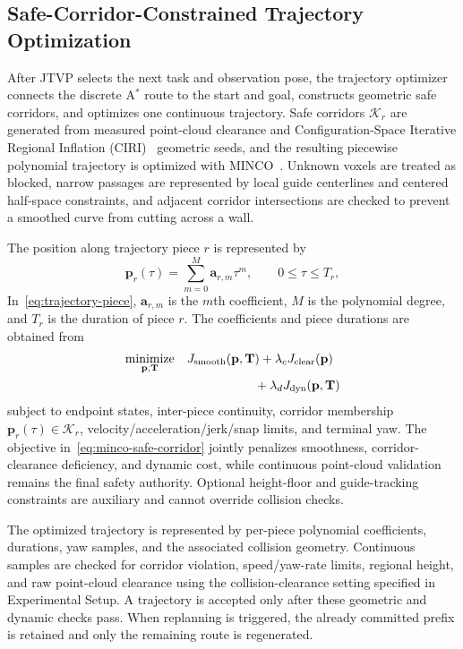 \documentclass[letterpaper,10pt,journal]{IEEEtran}
\begin{document}
\subsection{Safe-Corridor-Constrained Trajectory Optimization}

After JTVP selects the next task and observation pose, the trajectory optimizer connects the discrete A$^*$ route to the start and goal, constructs geometric safe corridors, and optimizes one continuous trajectory. Safe corridors $\mathcal K_r$ are generated from measured point-cloud clearance and Configuration-Space Iterative Regional Inflation (CIRI)~\cite{ren2025super} geometric seeds, and the resulting piecewise polynomial trajectory is optimized with MINCO~\cite{wang2022minco}. Unknown voxels are treated as blocked, narrow passages are represented by local guide centerlines and centered half-space constraints, and adjacent corridor intersections are checked to prevent a smoothed curve from cutting across a wall.

The position along trajectory piece $r$ is represented by
\begin{equation}
\mathbf{p}_r(\tau)=\sum_{m=0}^{M}\mathbf{a}_{r,m}\tau^m,
\qquad 0\leq\tau\leq T_r,
\label{eq:trajectory-piece}
\end{equation}
In~\eqref{eq:trajectory-piece}, $\mathbf{a}_{r,m}$ is the $m$th coefficient, $M$ is the polynomial degree, and $T_r$ is the duration of piece $r$. The coefficients and piece durations are obtained from
\begin{equation}
\begin{aligned}
\underset{\mathbf{p},\mathbf{T}}{\operatorname{minimize}}\quad
&J_{\mathrm{smooth}}(\mathbf{p},\mathbf{T})
+\lambda_cJ_{\mathrm{clear}}(\mathbf{p})\\
&\hspace{19mm}+\lambda_dJ_{\mathrm{dyn}}(\mathbf{p},\mathbf{T})
\end{aligned}
\label{eq:minco-safe-corridor}
\end{equation}
subject to endpoint states, inter-piece continuity, corridor membership $\mathbf{p}_r(\tau)\in\mathcal K_r$, velocity/acceleration/jerk/snap limits, and terminal yaw. The objective in~\eqref{eq:minco-safe-corridor} jointly penalizes smoothness, corridor-clearance deficiency, and dynamic cost, while continuous point-cloud validation remains the final safety authority. Optional height-floor and guide-tracking constraints are auxiliary and cannot override collision checks.

The optimized trajectory is represented by per-piece polynomial coefficients, durations, yaw samples, and the associated collision geometry. Continuous samples are checked for corridor violation, speed/yaw-rate limits, regional height, and raw point-cloud clearance using the collision-clearance setting specified in Experimental Setup. A trajectory is accepted only after these geometric and dynamic checks pass. When replanning is triggered, the already committed prefix is retained and only the remaining route is regenerated.
\end{document}
